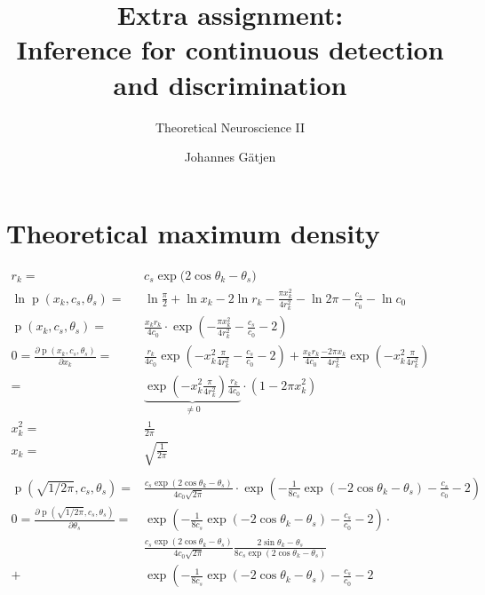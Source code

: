\documentclass{scrartcl}
\title{Extra assignment:\\Inference for continuous detection and discrimination}
\subtitle{Theoretical Neuroscience II}
\author{Johannes G\"atjen}
\begin{document}
\maketitle

\section{Theoretical maximum density}

\begin{align*}
r_k =& c_s \exp{(2 \cos{\theta_k-\theta_s)}}\\
\ln{\operatorname{p}(x_k, c_s, \theta_s)} =& 
	\ln{\frac{\pi}{2} + 
	\ln{x_k} - 
	2 \ln{r_k} - 
	\frac{\pi x_k^2}{4r_k^2} -
	\ln{2\pi} - 
	\frac{c_s}{c_0} - 
	\ln{c_0}}\\	
\operatorname{p} (x_k, c_s, \theta_s) =& 
	\frac{x_k r_k}{4 c_0} \cdot 
	\exp{\left( 
		-\frac{\pi x_k^2}{4r_k^2} - 
		\frac{c_s}{c_0} - 2 
		\right)}\\	
0 = \frac{\partial \operatorname{p} (x_k, c_s, \theta_s)}{\partial x_k} =& 
	\frac{r_k}{4c_0} 
	\exp{\left( 
		-x_k^2 
		\frac{\pi}{4r_k^2} - 
		\frac{c_s}{c_0} - 2 
		\right)} + 
	\frac{x_k r_k}{4c_0}
	\frac{-2\pi x_k}{4r_k^2} 
	\exp{\left( 
		-x_k^2 
		\frac{\pi}{4r_k^2} 
		\right) }\\	
=& \underbrace{
		\exp{\left( 
			-x_k^2 
			\frac{\pi}{4r_k^2}  
			\right)}
		\frac{r_k}{4c_0}}_{\neq 0} \cdot 
	\left( 1 - 2\pi x_k^2 \right)\\
x_k^2 =& \frac{1}{2\pi}\\
x_k =& \sqrt{\frac{1}{2\pi}}\\ \\
\operatorname{p}(\sqrt{1/2\pi}, c_s, \theta_s) =& 
	\frac{c_s 
		\exp{\left( 
			2 \cos{\theta_k - \theta_s}
			\right)}}
		{4c_0\sqrt{2\pi}} \cdot
	 \exp{\left(
	 	-\frac{1}{8c_s}
	 	\exp{\left(
	 		-2\cos{\theta_k - \theta_s}
	 		\right)}-
	 	\frac{c_s}{c_0}-2
	 	\right)} \\	 	
0 = \frac{\partial \operatorname{p}(\sqrt{1/2\pi}, c_s, \theta_s)}{\partial \theta_s} =& \exp{\left(
		-\frac{1}{8c_s}
		\exp{\left(
			-2\cos{\theta_k - \theta_s}
			\right)} -
		\frac{c_s}{c_0}-2
		\right)} \cdot \\
	&\frac{c_s 
		\exp{\left(
			2 \cos{\theta_k - \theta_s}
			\right)}}
		{4c_0\sqrt{2\pi}} 
	\frac{2\sin{\theta_k-\theta_s}}{8c_s\exp{\left(
		2\cos{\theta_k - \theta_s}
		\right)}} \\
+& \exp{\left(
		-\frac{1}{8c_s}
		\exp{\left(
			-2\cos{\theta_k - \theta_s}
			\right)} -
		\frac{c_s}{c_0}-2
}
\end{align*}
\end{document}
